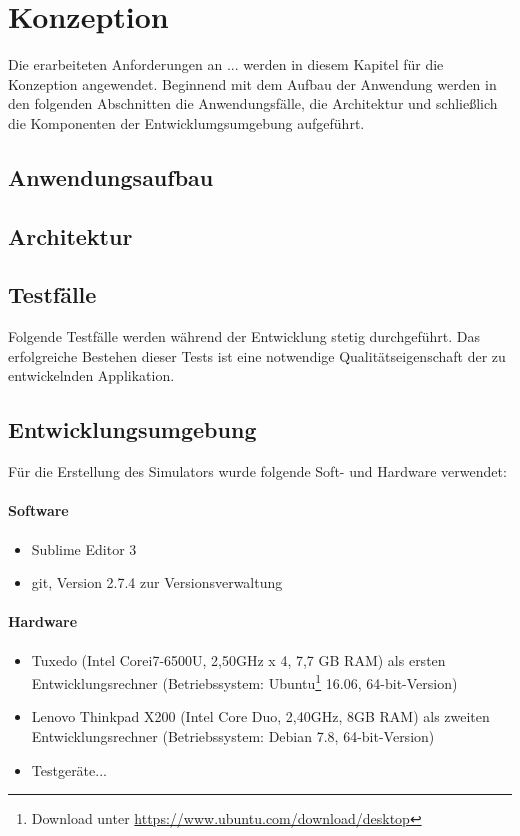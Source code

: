 \chapter{\label{chap:konzeption}Konzeption}
Die erarbeiteten Anforderungen an ... werden in diesem Kapitel für die Konzeption angewendet.
Beginnend mit dem Aufbau der Anwendung werden in den folgenden Abschnitten die Anwendungsfälle,
die Architektur und schließlich die Komponenten der Entwicklumgsumgebung aufgeführt.
%
%
\section{Anwendungsaufbau}
%
%
\section{Architektur}
%
%
\section{Testfälle}
Folgende Testfälle werden während der Entwicklung stetig durchgeführt. Das erfolgreiche Bestehen dieser Tests ist eine notwendige Qualitätseigenschaft der zu entwickelnden Applikation.
%
%
\section{Entwicklungsumgebung}
Für die Erstellung des Simulators wurde folgende Soft- und Hardware verwendet:
\subsubsection{Software}
\begin{itemize}
	\item Sublime Editor 3
	\item git, Version 2.7.4 zur Versionsverwaltung
\end{itemize}
\subsubsection{Hardware}
\begin{itemize}
	\item Tuxedo (Intel\textsuperscript{\textregistered} Core\texttrademark i7-6500U, 2,50GHz x 4, 7,7 GB RAM) als ersten Entwicklungsrechner
	(Betriebssystem: Ubuntu\footnote{ Download unter \url{https://www.ubuntu.com/download/desktop}} 16.06, 64-bit-Version)
	\item Lenovo Thinkpad X200 (Intel\textsuperscript{\textregistered} Core Duo, 2,40GHz, 8GB RAM) als zweiten Entwicklungsrechner (Betriebssystem: Debian 7.8, 64-bit-Version)
	\item Testgeräte...
\end{itemize}
